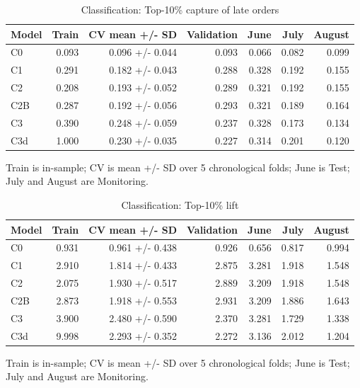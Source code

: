 \begin{table}[htbp]
\centering
\small
\caption{Classification: Top-10\% capture of late orders}
\begin{tabular}{lrrrrrr}
\toprule
Model & Train & CV mean +/- SD & Validation & June & July & August \\
\midrule
C0 & 0.093 & 0.096 +/- 0.044 & 0.093 & 0.066 & 0.082 & 0.099 \\
C1 & 0.291 & 0.182 +/- 0.043 & 0.288 & 0.328 & 0.192 & 0.155 \\
C2 & 0.208 & 0.193 +/- 0.052 & 0.289 & 0.321 & 0.192 & 0.155 \\
C2B & 0.287 & 0.192 +/- 0.056 & 0.293 & 0.321 & 0.189 & 0.164 \\
C3 & 0.390 & 0.248 +/- 0.059 & 0.237 & 0.328 & 0.173 & 0.134 \\
C3d & 1.000 & 0.230 +/- 0.035 & 0.227 & 0.314 & 0.201 & 0.120 \\
\bottomrule
\end{tabular}
\par\smallskip\begin{minipage}{\linewidth}\footnotesize Train is in-sample; CV is mean +/- SD over 5 chronological folds; June is Test; July and August are Monitoring.\end{minipage}
\end{table}


\begin{table}[htbp]
\centering
\small
\caption{Classification: Top-10\% lift}
\begin{tabular}{lrrrrrr}
\toprule
Model & Train & CV mean +/- SD & Validation & June & July & August \\
\midrule
C0 & 0.931 & 0.961 +/- 0.438 & 0.926 & 0.656 & 0.817 & 0.994 \\
C1 & 2.910 & 1.814 +/- 0.433 & 2.875 & 3.281 & 1.918 & 1.548 \\
C2 & 2.075 & 1.930 +/- 0.517 & 2.889 & 3.209 & 1.918 & 1.548 \\
C2B & 2.873 & 1.918 +/- 0.553 & 2.931 & 3.209 & 1.886 & 1.643 \\
C3 & 3.900 & 2.480 +/- 0.590 & 2.370 & 3.281 & 1.729 & 1.338 \\
C3d & 9.998 & 2.293 +/- 0.352 & 2.272 & 3.136 & 2.012 & 1.204 \\
\bottomrule
\end{tabular}
\par\smallskip\begin{minipage}{\linewidth}\footnotesize Train is in-sample; CV is mean +/- SD over 5 chronological folds; June is Test; July and August are Monitoring.\end{minipage}
\end{table}


